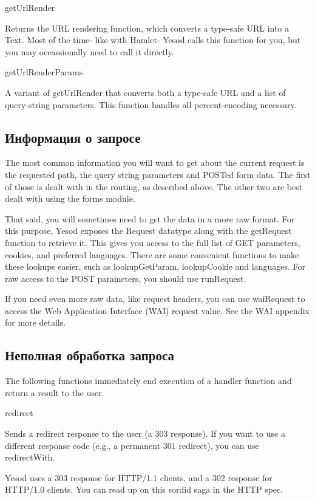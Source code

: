 getUrlRender

Returns the URL rendering function, which converts a type-safe URL
into a Text. Most of the time- like with Hamlet- Yesod calls this
function for you, but you may occassionally need to call it directly.

getUrlRenderParams

A variant of getUrlRender that converts both a type-safe URL and a
list of query-string parameters. This function handles all
percent-encoding necessary.

\subsection{Информация о запросе}

The most common information you will want to get about the current
request is the requested path, the query string parameters and POSTed
form data. The first of those is dealt with in the routing, as
described above. The other two are best dealt with using the forms
module.

That said, you will sometimes need to get the data in a more raw
format. For this purpose, Yesod exposes the Request datatype along
with the getRequest function to retrieve it. This gives you access to
the full list of GET parameters, cookies, and preferred
languages. There are some convenient functions to make these lookups
easier, such as lookupGetParam, lookupCookie and languages. For raw
access to the POST parameters, you should use runRequest.

If you need even more raw data, like request headers, you can use
waiRequest to access the Web Application Interface (WAI) request
value. See the WAI appendix for more details.

\subsection{Неполная обработка запроса}

The following functions immediately end execution of a handler
function and return a result to the user.

redirect

Sends a redirect response to the user (a 303 response). If you want to
use a different response code (e.g., a permanent 301 redirect), you
can use redirectWith.

Yesod uses a 303 response for HTTP/1.1 clients, and a 302 response for
HTTP/1.0 clients. You can read up on this sordid saga in the HTTP
spec.

